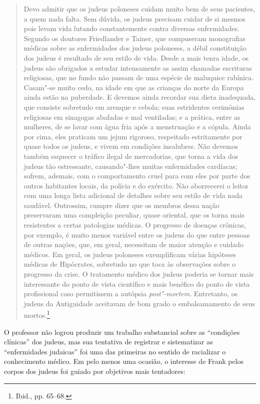 \begin{quote}
Devo admitir que os judeus poloneses cuidam muito bem de seus pacientes,
a quem nada falta. Sem dúvida, os judeus precisam cuidar de si mesmos
pois levam vida lutando constantemente contra diversas enfermidades.
Segundo os doutores Friedlander e Tainer, que compuseram monografias
médicas sobre as enfermidades dos judeus poloneses, a débil constituição
dos judeus é resultado de seu estilo de vida. Desde a mais tenra idade,
os judeus são obrigados a estudar intensamente as assim chamadas
escrituras religiosas, que no fundo não passam de uma espécie de
maluquice rabínica. Casam"-se muito cedo, na idade em que as crianças do
norte da Europa ainda estão na puberdade. E devemos ainda recordar
sua dieta inadequada, que consiste sobretudo em arenque e cebola; suas
estridentes cerimônias religiosas em sinagogas abafadas e mal
ventiladas; e a prática, entre as mulheres, de se lavar com água fria
após a menstruação e a cópula. Ainda por cima, eles praticam um jejum
rigoroso, respeitado estritamente por quase todos os judeus, e vivem em
condições insalubres. Não devemos também esquecer o tráfico ilegal de
mercadorias, que torna a vida dos judeus tão estressante, causando"-lhes
muitas enfermidades cardíacas; sofrem, ademais, com o comportamento
cruel para com eles por parte dos outros habitantes locais, da polícia e
do exército. Não aborrecerei o leitor com uma longa lista adicional de
detalhes sobre seu estilo de vida nada saudável. Outrossim, cumpre dizer
que os membros dessa nação preservaram uma compleição peculiar, quase
oriental, que os torna mais resistentes a certas patologias médicas. O
progresso de doenças crônicas, por exemplo, é muito menos variável entre
os judeus do que entre pessoas de outras nações, que, em geral,
necessitam de maior atenção e cuidado médicos. Em geral, os judeus
poloneses exemplificam várias hipóteses médicas de Hipócrates, sobretudo
no que toca às observações sobre o progresso da crise. O tratamento
médico dos judeus poderia se tornar mais interessante do ponto de vista
científico e mais benéfico do ponto de vista profissional caso
permitissem a autópsia \textit{post"-mortem}. Entretanto, os judeus da
Antiguidade aceitavam de bom grado o embalsamamento de seus
mortos.\footnote{Ibid., pp. 65--68.}
\end{quote}

O professor não logrou produzir um trabalho substancial sobre as
``condições clínicas'' dos judeus, mas sua tentativa de registrar e
sistematizar as ``enfermidades judaicas'' foi uma das primeiras no
sentido de racializar o conhecimento médico. Em pelo menos uma ocasião,
o interesse de Frank pelos corpos dos judeus foi guiado por objetivos
mais tentadores:

